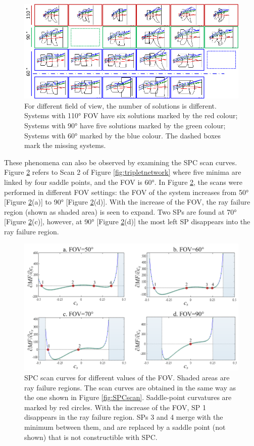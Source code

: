 \begin{figure}[h!]
    \centering
    \includegraphics[width=1.0\textwidth]{chapter-3/figures/FOVvarying.png}
    \caption{For different field of view, the number of solutions is different. Systems with 110° FOV have six solutions marked by the red colour; Systems with 90° have five solutions marked by the green colour; Systems with 60° marked by the blue colour. The dashed boxes mark the missing systems.}
    \label{fig:FOVvarying}
\end{figure}

These phenomena can also be observed by examining the SPC scan curves. Figure \ref{fig:phasechange_field} refers to Scan 2 of Figure \ref{fig:tripletnetwork} where five minima are linked by four saddle points, and the FOV is 60°. In Figure \ref{fig:phasechange_field}, the scans were performed in different FOV settings: the FOV of the system increases from 50° [Figure \ref{fig:phasechange_field}(a)] to 90° [Figure \ref{fig:phasechange_field}(d)]. With the increase of the FOV, the ray failure region (shown as shaded area) is seen to expand. Two SPs are found at 70° [Figure \ref{fig:phasechange_field}(c)], however, at 90° [Figure \ref{fig:phasechange_field}(d)] the most left SP disappears into the ray failure region.
\begin{figure}[h!]
    \centering
    \includegraphics[width=.85\textwidth]{chapter-3/figures/PhaseTransition_field.png}
    \caption{SPC scan curves for different values of the FOV. Shaded areas are ray failure regions. The scan curves are obtained in the same way as the one shown in Figure \ref{fig:SPCscan}. Saddle-point curvatures are marked by red circles. With the increase of the FOV, SP 1 disappears in the ray failure region. SPs 3 and 4 merge with the minimum between them, and are replaced by a saddle point (not shown) that is not constructible with SPC.}
    \label{fig:phasechange_field}
\end{figure}

